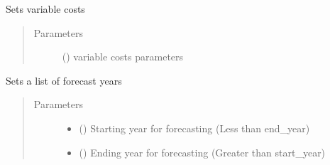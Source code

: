 \documentclass[a4paper,12pt,english]{article}
\begin{document}
\begin{fulllineitems}
\begin{fulllineitems}
\begin{quote}
\begin{description}
\end{description}\end{quote}

\end{fulllineitems}


\begin{fulllineitems}
\label{\detokenize{GOCPI:GOCPI.CreateCases.CreateCases.set_variable_cost}}
Sets variable costs
\begin{quote}\begin{description}
\item[{Parameters}] \leavevmode
{} (\sphinxstyleliteralemphasis{\sphinxupquote{, }}) \textendash{} variable costs parameters

\end{description}\end{quote}

\end{fulllineitems}


\begin{fulllineitems}
\label{\detokenize{GOCPI:GOCPI.CreateCases.CreateCases.set_year}}
Sets a list of forecast years
\begin{quote}\begin{description}
\item[{Parameters}] \leavevmode\begin{itemize}
\item {} 
 () \textendash{} Starting year for forecasting (Less than end\_year)

\item {} 
 () \textendash{} Ending year for forecasting (Greater than start\_year)


\end{itemize}
\end{description}
\end{quote}
\end{fulllineitems}
\end{fulllineitems}
\end{document}
